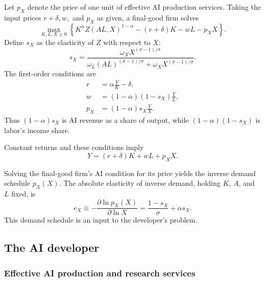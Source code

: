 Let \(p_X\) denote the price of one unit of effective AI production services. Taking the input prices \(r+\delta,w,\) and \(p_X\) as given, a final-good firm solves
\begin{equation}
 \max_{K,L,X\geq0}
 \left\{K^\alpha Z(AL,X)^{1-\alpha}-(r+\delta)K-wL-p_XX\right\}.
 \label{eq:rewrite-final-firm-problem}
\end{equation}
Define $s_X$ as the elasticity of $Z$ with respect to $X$:
\begin{equation}
 s_X=\frac{\omega_XX^{(\sigma-1)/\sigma}}
 {\omega_L(AL)^{(\sigma-1)/\sigma}
 +\omega_XX^{(\sigma-1)/\sigma}}.
 \label{eq:rewrite-sx}
\end{equation}
The first-order conditions are
\begin{align}
 r&=\alpha\frac{Y}{K}-\delta,
 \label{eq:rewrite-capital-return}\\
 w&=(1-\alpha)(1-s_X)\frac{Y}{L},
 \label{eq:rewrite-wage}\\
 p_X&=(1-\alpha)s_X\frac{Y}{X}.
 \label{eq:rewrite-ai-price}
\end{align}
Thus $(1-\alpha)s_X$ is AI revenue as a share of output, while
$(1-\alpha)(1-s_X)$ is labor's income share.

Constant returns and these conditions imply
\begin{equation}
 Y=(r+\delta)K+wL+p_XX.
 \label{eq:rewrite-final-zero-profit}
\end{equation}

Solving the final-good firm's AI condition for its price yields the inverse
demand schedule $p_X(X)$. %
The absolute elasticity of inverse demand, holding $K$, $A$, and $L$ fixed, is
\begin{equation}
 e_X\equiv-
 \frac{\partial\ln p_X(X)}{\partial\ln X}
 =\frac{1-s_X}{\sigma}+\alpha s_X.
 \label{eq:rewrite-inverse-demand-elasticity}
\end{equation}
This demand schedule is an input to the developer's problem.

\subsection{The AI developer}
\label{subsec:rewrite-developer}

\subsubsection{Effective AI production and research services}
\label{subsubsec:rewrite-ai-services}

